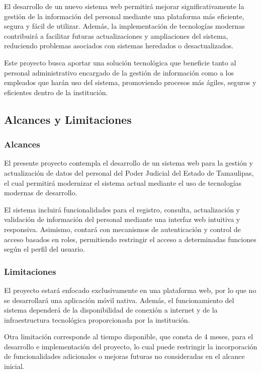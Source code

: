 El desarrollo de un nuevo sistema web permitirá mejorar significativamente la gestión de la información del personal mediante una plataforma más eficiente, segura y fácil de utilizar. Además, la implementación de tecnologías modernas contribuirá a facilitar futuras actualizaciones y ampliaciones del sistema, reduciendo problemas asociados con sistemas heredados o desactualizados.

Este proyecto busca aportar una solución tecnológica que beneficie tanto al personal administrativo encargado de la gestión de información como a los empleados que harán uso del sistema, promoviendo procesos más ágiles, seguros y eficientes dentro de la institución.
\subsection{Alcances y Limitaciones}
\label{sec:alcances_limitaciones}

\subsubsection{Alcances}
\label{subsec:alcances}

El presente proyecto contempla el desarrollo de un sistema web para la gestión y actualización de datos del personal del Poder Judicial del Estado de Tamaulipas, el cual permitirá modernizar el sistema actual mediante el uso de tecnologías modernas de desarrollo.

El sistema incluirá funcionalidades para el registro, consulta, actualización y validación de información del personal mediante una interfaz web intuitiva y responsiva. Asimismo, contará con mecanismos de autenticación y control de acceso basados en roles, permitiendo restringir el acceso a determinadas funciones según el perfil del usuario.

\subsubsection{Limitaciones}
\label{subsec:limitaciones}

El proyecto estará enfocado exclusivamente en una plataforma web, por lo que no se desarrollará una aplicación móvil nativa. Además, el funcionamiento del sistema dependerá de la disponibilidad de conexión a internet y de la infraestructura tecnológica proporcionada por la institución.

Otra limitación corresponde al tiempo disponible, que consta de 4 meses, para el desarrollo e implementación del proyecto, lo cual puede restringir la incorporación de funcionalidades adicionales o mejoras futuras no consideradas en el alcance inicial.


